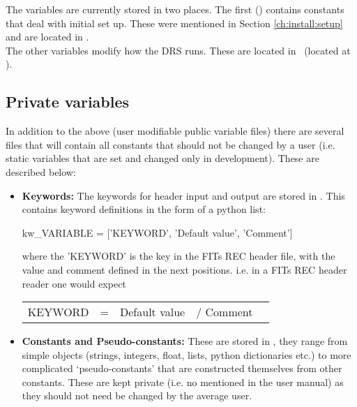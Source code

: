 The variables are currently stored in two places. The first (\configtxtfile) contains constants that deal with initial set up. These were mentioned in Section \ref{ch:install:setup} and are located in \configtxtfilepath. \\

\noindent The other variables modify how the DRS runs. These are located in \constantsfile\, (located at \constantsfilepath).  \\


\ifdevguide
\subsection{Private variables}

\noindent In addition to the above (user modifiable public variable files) there are several files that will contain all constants that should not be changed by a user (i.e. static variables that are set and changed only in development). These are described below:

\begin{itemize}

	\item \textbf{Keywords:} The keywords for header input and output are stored in \spirouKeywords. This contains keyword definitions in the form of a python list:  \\

	\begin{pythonbox}
	kw_VARIABLE = ['KEYWORD', 'Default value', 'Comment']
	\end{pythonbox}

	\noindent where the 'KEYWORD' is the key in the FITs REC header file, with the value and comment defined in the next positions. i.e. in a FITs REC header reader one would expect

	\begin{thighlight}
	\begin{tabular}{l c r c l}
	KEYWORD & = & Default value & / Comment \\
	\end{tabular}
	\end{thighlight}


	\item \textbf{Constants and Pseudo-constants:} These are stored in \spirouConst, they range from simple objects (strings, integers, float, lists, python dictionaries etc.) to more complicated `pseudo-constants' that are constructed themselves from other constants. These are kept private (i.e. no mentioned in the user manual) as they should not need be changed by the average user.

\end{itemize}

